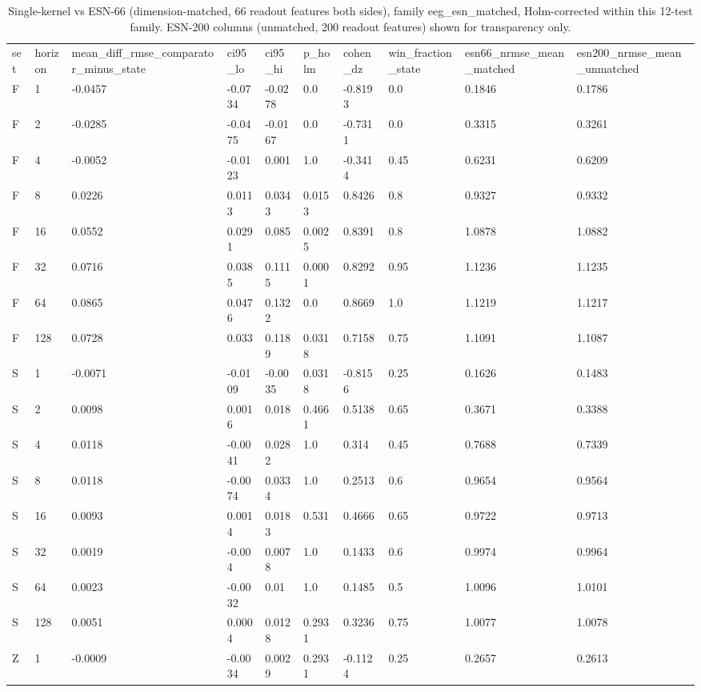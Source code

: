 \begin{table}
\caption{Single-kernel vs ESN-66 (dimension-matched, 66 readout features both sides), family eeg\_esn\_matched, Holm-corrected within this 12-test family. ESN-200 columns (unmatched, 200 readout features) shown for transparency only.}
\label{tab:esn_matched}
\begin{ruledtabular}
\begin{tabular}{llllllllll}
set & horizon & mean_diff_rmse_comparator_minus_state & ci95_lo & ci95_hi & p_holm & cohen_dz & win_fraction_state & esn66_nrmse_mean_matched & esn200_nrmse_mean_unmatched \\
F & 1 & -0.0457 & -0.0734 & -0.0278 & 0.0 & -0.8193 & 0.0 & 0.1846 & 0.1786 \\
F & 2 & -0.0285 & -0.0475 & -0.0167 & 0.0 & -0.7311 & 0.0 & 0.3315 & 0.3261 \\
F & 4 & -0.0052 & -0.0123 & 0.001 & 1.0 & -0.3414 & 0.45 & 0.6231 & 0.6209 \\
F & 8 & 0.0226 & 0.0113 & 0.0343 & 0.0153 & 0.8426 & 0.8 & 0.9327 & 0.9332 \\
F & 16 & 0.0552 & 0.0291 & 0.085 & 0.0025 & 0.8391 & 0.8 & 1.0878 & 1.0882 \\
F & 32 & 0.0716 & 0.0385 & 0.1115 & 0.0001 & 0.8292 & 0.95 & 1.1236 & 1.1235 \\
F & 64 & 0.0865 & 0.0476 & 0.1322 & 0.0 & 0.8669 & 1.0 & 1.1219 & 1.1217 \\
F & 128 & 0.0728 & 0.033 & 0.1189 & 0.0318 & 0.7158 & 0.75 & 1.1091 & 1.1087 \\
S & 1 & -0.0071 & -0.0109 & -0.0035 & 0.0318 & -0.8156 & 0.25 & 0.1626 & 0.1483 \\
S & 2 & 0.0098 & 0.0016 & 0.018 & 0.4661 & 0.5138 & 0.65 & 0.3671 & 0.3388 \\
S & 4 & 0.0118 & -0.0041 & 0.0282 & 1.0 & 0.314 & 0.45 & 0.7688 & 0.7339 \\
S & 8 & 0.0118 & -0.0074 & 0.0334 & 1.0 & 0.2513 & 0.6 & 0.9654 & 0.9564 \\
S & 16 & 0.0093 & 0.0014 & 0.0183 & 0.531 & 0.4666 & 0.65 & 0.9722 & 0.9713 \\
S & 32 & 0.0019 & -0.004 & 0.0078 & 1.0 & 0.1433 & 0.6 & 0.9974 & 0.9964 \\
S & 64 & 0.0023 & -0.0032 & 0.01 & 1.0 & 0.1485 & 0.5 & 1.0096 & 1.0101 \\
S & 128 & 0.0051 & 0.0004 & 0.0128 & 0.2931 & 0.3236 & 0.75 & 1.0077 & 1.0078 \\
Z & 1 & -0.0009 & -0.0034 & 0.0029 & 0.2931 & -0.1124 & 0.25 & 0.2657 & 0.2613 \\

\end{tabular}
\end{ruledtabular}
\end{table}
